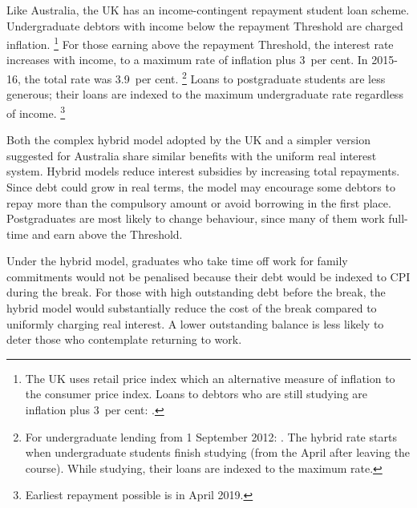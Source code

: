 \documentclass[embargoed]{grattan}
\begin{document}
Like Australia, the UK has an income-contingent repayment student loan scheme.
Undergraduate debtors with income below the repayment \gls{Threshold} are charged inflation.%
\footnote{The UK uses retail price index which an alternative measure of inflation to the consumer price index.
Loans to debtors who are still studying are inflation plus 3~per cent: \textcite{Company2015Studentloanrepayment}.} For those earning above the repayment \gls{Threshold}, the interest rate increases with income, to a maximum rate of inflation plus 3~per cent.
In 2015-16, the total rate was 3.9~per cent.%
\footnote{For undergraduate lending from 1 September 2012: \textcite{Company2015Studentloanrepayment}.
The hybrid rate starts when undergraduate students finish studying (from the April after leaving the course).
While studying, their loans are indexed to the maximum rate.} Loans to postgraduate students are less generous; their loans are indexed to the maximum undergraduate rate regardless of income.%
\footnote{Earliest repayment possible is in April 2019.}

Both the complex hybrid model adopted by the UK and a simpler version suggested for Australia share similar benefits with the uniform real interest system.
Hybrid models reduce interest subsidies by increasing total repayments.
Since debt could grow in real terms, the model may encourage some debtors to repay more than the compulsory amount or avoid borrowing in the first place.
Postgraduates are most likely to change behaviour, since many of them work full-time and earn above the \gls{Threshold}.

Under the hybrid model, graduates who take time off work for family commitments would not be penalised because their debt would be indexed to \gls{CPI} during the break.
For those with high outstanding debt before the break, the hybrid model would substantially reduce the cost of the break compared to uniformly charging real interest.
A lower outstanding balance is less likely to deter those who contemplate returning to work.
\end{document}
